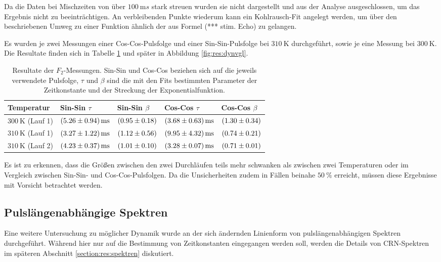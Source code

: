 Da die Daten bei Mischzeiten von über $\SI{100}{\milli s}$ stark streuen wurden sie nicht dargestellt und aus der Analyse ausgeschlossen, um das Ergebnis nicht zu beeinträchtigen. An verbleibenden Punkte wiederum kann ein Kohlrausch-Fit angelegt werden, um über den beschriebenen Umweg zu einer Funktion ähnlich der aus Formel (*** stim. Echo) zu gelangen.

Es wurden je zwei Messungen einer Cos-Cos-Pulsfolge und einer Sin-Sin-Pulsfolge bei $\SI{310}{\kelvin}$ durchgeführt, sowie je eine Messung bei $\SI{300}{\kelvin}$. Die Resultate finden sich in Tabelle \ref{tab:res:F_2} und später in Abbildung \ref{fig:res:dynvgl}.
\begin{table}
	\centering
	\begin{tabular}{lllll}
		\hline
		Temperatur & Sin-Sin $\tau$ & Sin-Sin $\beta$ & Cos-Cos $\tau$ & Cos-Cos $\beta$ \\ \hline
		$\SI{300}{\kelvin}$ (Lauf 1) & $\SI{5.26 (94)}{\milli s}$ & $\SI{0.95 (18)}{}$ & $\SI{3.68 (63)}{\milli s}$ & $\SI{1.30 (34)}{}$ \\
		$\SI{310}{\kelvin}$ (Lauf 1) & $\SI{3.27 (122)}{\milli s}$ & $\SI{1.12 (56)}{}$ & $\SI{9.95 (432)}{\milli s}$ & $\SI{0.74 (21)}{}$ \\
		$\SI{310}{\kelvin}$ (Lauf 2) & $\SI{4.23 (37)}{\milli s}$ & $\SI{1.01 (10)}{}$ & $\SI{3.28 (7)}{\milli s}$ & $\SI{0.71 (1)}{}$ \\
		 \hline
	\end{tabular}
	\caption{Resultate der $F_2$-Messungen. Sin-Sin und Cos-Cos beziehen sich auf die jeweils verwendete Pulsfolge, $\tau$ und $\beta$ sind die mit den Fits bestimmten Parameter der Zeitkonstante und der Streckung der Exponentialfunktion. \label{tab:res:F_2}}
\end{table}

Es ist zu erkennen, dass die Größen zwischen den zwei Durchläufen teils mehr schwanken als zwischen zwei Temperaturen oder im Vergleich zwischen Sin-Sin- und Cos-Cos-Pulsfolgen. Da die Unsicherheiten zudem in Fällen beinahe $\SI{50}{\percent}$ erreicht, müssen diese Ergebnisse mit Vorsicht betrachtet werden.



\subsection{Pulslängenabhängige Spektren} \label{section:res:spekdyn}

Eine weitere Untersuchung zu möglicher Dynamik wurde an der sich ändernden Linienform von pulslängenabhängigen Spektren durchgeführt. Während hier nur auf die Bestimmung von Zeitkonstanten eingegangen werden soll, werden die Details von CRN-Spektren im späteren Abschnitt \ref{section:res:spektren} diskutiert.

